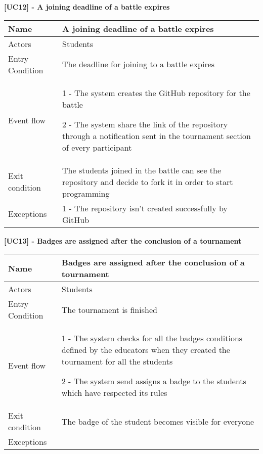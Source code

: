     \begin{table}[]
    \textbf{[UC12] - A joining deadline of a battle expires}
    
      \centering
      \begin{tabular}{|p{3cm}|p{14cm}|}
        \hline
         Name & A joining deadline of a battle expires \\
        \hline
        Actors & Students \\
        \hline
        Entry Condition & The deadline for joining to a battle expires \\
        \hline
        Event flow &  1 - The system creates the GitHub repository for the battle
        
        2 - The system share the link of the repository through a notification sent in the tournament section of every participant
        \\
        \hline
        Exit condition & The students joined in the battle can see the repository and decide to fork it in order to start programming \\
        \hline
        Exceptions & 1 - The repository isn't created successfully by GitHub
        \\
        \hline
      \end{tabular}
      
    \end{table}

    \begin{table}[]
    \textbf{[UC13] - Badges are assigned after the conclusion of a tournament}
    
      \centering
      \begin{tabular}{|p{3cm}|p{14cm}|}
        \hline
         Name & Badges are assigned after the conclusion of a tournament \\
        \hline
        Actors & Students \\
        \hline
        Entry Condition & The tournament is finished \\
        \hline
        Event flow &  1 - The system checks for all the badges conditions defined by the educators when they created the tournament for all the students 
        
        2 - The system send assigns a badge to the students which have respected its rules
        \\
        \hline
        Exit condition & The badge of the student becomes visible for everyone \\
        \hline
        Exceptions &
        \\
        \hline
      \end{tabular}
      
    \end{table}

